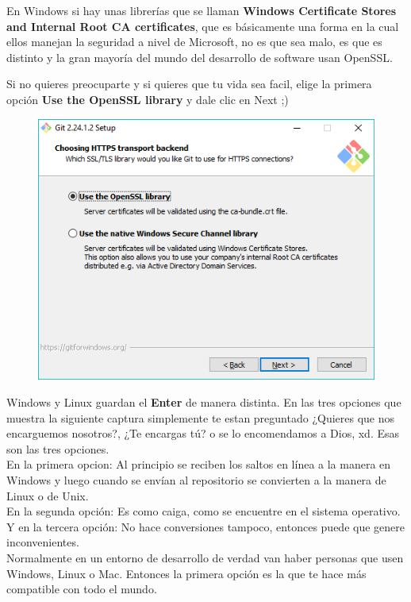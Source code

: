 \documentclass{article}
\begin{document}
En Windows si hay unas librerías que se llaman \textbf{Windows Certificate
Stores and Internal Root CA certificates}, que es básicamente una forma en la
cual ellos manejan la seguridad a nivel de Microsoft, no es que sea malo, es
que es distinto y la gran mayoría del mundo del desarrollo de software usan
OpenSSL.

Si no quieres preocuparte y si quieres que tu vida sea facil, elige la primera
opción \textbf{Use the OpenSSL library} y dale clic en Next ;)

\begin{figure}[h!]
  \centering
  \includegraphics[scale=0.65]{./Pictures/018_install_git.png}
\end{figure}

Windows y Linux guardan el \textbf{Enter} de manera distinta. En las tres
opciones que muestra la siguiente captura simplemente te estan preguntado
¿Quieres que nos encarguemos nosotros?, ¿Te encargas tú? o se lo encomendamos a
Dios, xd. Esas son las tres opciones.\\

En la primera opcion: Al principio se reciben los saltos en línea a la manera
en Windows y luego cuando se envían al repositorio se convierten a la manera de
Linux o de Unix.\\
En la segunda opción: Es como caiga, como se encuentre en el sistema
operativo.\\
Y en la tercera opción: No hace conversiones tampoco, entonces puede que genere
inconvenientes.\\

Normalmente en un entorno de desarrollo de verdad van haber personas que usen
Windows, Linux o Mac. Entonces la primera opción es la que te hace más
compatible con todo el mundo.
\end{document}
